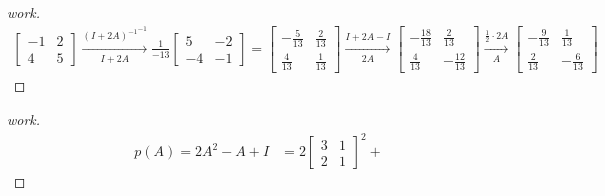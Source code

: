 \documentclass{article}
\begin{document}
\begin{enumerate}
    \begin{proof}[work]
        \begin{align*}
            \begin{bmatrix}
                -1 & 2 \\
                4  & 5
            \end{bmatrix} \xrightarrow[I + 2A]{{(I + 2A)^{-1}}^{-1}}
            \frac{1}{-13}
            \begin{bmatrix}
                5  & -2 \\
                -4 & -1
            \end{bmatrix} =
            \begin{bmatrix}
                -\frac{5}{13} & \frac{2}{13} \\
                \frac{4}{13}  & \frac{1}{13}
            \end{bmatrix} \xrightarrow[2A]{I + 2A - I}
            \begin{bmatrix}
                -\frac{18}{13} & \frac{2}{13}   \\
                \frac{4}{13}   & -\frac{12}{13}
            \end{bmatrix} \xrightarrow[A]{\frac{1}{2} \cdot 2A}
            \begin{bmatrix}
                -\frac{9}{13} & \frac{1}{13}  \\
                \frac{2}{13}  & -\frac{6}{13}
            \end{bmatrix}
        \end{align*}
    \end{proof}
    \begin{proof}[work]
        \begin{align*}
            p(A) = 2A^2 - A + I & = 2\begin{bmatrix}
                                         3 & 1 \\
                                         2 & 1
                                     \end{bmatrix}^2 +

\end{align*}
\end{proof}
\end{enumerate}
\end{document}
